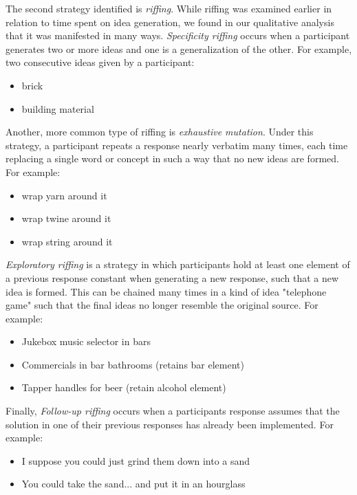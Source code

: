 The second strategy identified is \emph{riffing}. While riffing was examined earlier in relation to time spent on idea generation, we found in our qualitative analysis that it was manifested in many ways. \emph{Specificity riffing} occurs when a participant generates two or more ideas and one is a generalization of the other. For example, two consecutive ideas given by a participant:

\begin{itemize}
    \item brick
    \item building material
\end{itemize}

Another, more common type of riffing is \emph{exhaustive mutation}. Under this strategy, a participant repeats a response nearly verbatim many times, each time replacing a single word or concept in such a way that no new ideas are formed. For example:

\begin{itemize}
    \item wrap yarn around it
    \item wrap twine around it
    \item wrap string around it
\end{itemize}

\emph{Exploratory riffing} is a strategy in which participants hold at least one element of a previous response constant when generating a new response, such that a new idea is formed. This can be chained many times in a kind of idea "telephone game" such that the final ideas no longer resemble the original source. For example:

\begin{itemize}
    \item Jukebox music selector in bars
    \item Commercials in bar bathrooms (retains bar element)
    \item Tapper handles for beer (retain alcohol element)
\end{itemize}

Finally, \emph{Follow-up riffing} occurs when a participants response assumes that the solution in one of their previous responses has already been implemented. For example:

\begin{itemize}
    \item I suppose you could just grind them down into a sand
    \item You could take the sand... and put it in an hourglass
\end{itemize}

